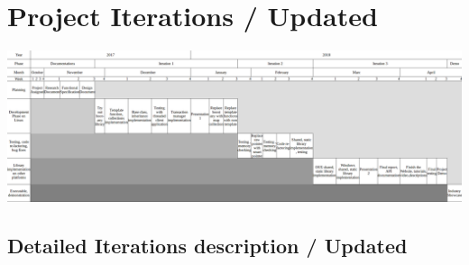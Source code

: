 \documentclass[12pt]{article}
\begin{document}
\section{Project Iterations / Updated}
\begin{center}
\includegraphics[angle=90,width=\textwidth,height=\textheight, height=18cm, keepaspectratio]{Pictures/gant_chart.png}
\end{center}
\newpage
\subsection{Detailed Iterations description / Updated}
\end{document}

